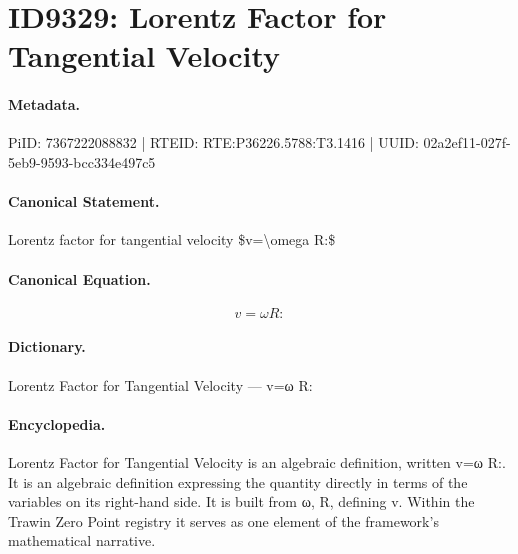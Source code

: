 \section*{ID9329: Lorentz Factor for Tangential Velocity}
\paragraph{Metadata.}
PiID: 7367222088832 | RTEID: RTE:P36226.5788:T3.1416 | UUID: 02a2ef11-027f-5eb9-9593-bcc334e497c5

\paragraph{Canonical Statement.}
Lorentz factor for tangential velocity \$v=\textbackslash{}omega R:\$

\paragraph{Canonical Equation.}
\[
v=\omega R:
\]

\paragraph{Dictionary.}
Lorentz Factor for Tangential Velocity — v=ω R:

\paragraph{Encyclopedia.}
Lorentz Factor for Tangential Velocity is an algebraic definition, written v=ω R:. It is an algebraic definition expressing the quantity directly in terms of the variables on its right-hand side. It is built from ω, R, defining v. Within the Trawin Zero Point registry it serves as one element of the framework's mathematical narrative.
